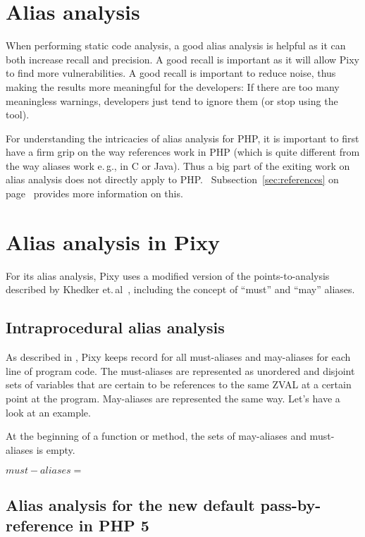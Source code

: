 \chapter{Alias analysis}

When performing static code analysis, a good alias analysis is helpful as it can both increase recall and precision. A good recall is important as it will allow Pixy to find more vulnerabilities. A good recall is important to reduce noise, thus making the results more meaningful for the developers: If there are too many meaningless warnings, developers just tend to ignore them (or stop using the tool).~\cite{understanding-value}

For understanding the intricacies of alias analysis for PHP, it is important to first have a firm grip on the way references work in PHP (which is quite different from the way aliases work e.\,g., in C or Java). Thus a big part of the exiting work on alias analysis does not directly apply to PHP.~\cite[page~24]{pixy} Subsection~\ref{sec:references} on page~\pageref{sec:references} provides more information on this.

\chapter{Alias analysis in Pixy}

For its alias analysis, Pixy uses a modified version of the points-to-analysis described by Khedker et.\,al~\cite[page 119ff]{khedker}, including the concept of ``must'' and ``may'' aliases.

\section{Intraprocedural alias analysis}

As described in \cite{pixy}, Pixy keeps record for all must-aliases and may-aliases for each line of program code. The must-aliases are represented as unordered and disjoint sets of variables that are certain to be references to the same ZVAL at a certain point at the program. May-aliases are represented the same way. Let's have a look at an example.

At the beginning of a function or method, the sets of may-aliases and must-aliases is empty.

$must-aliases = $

\begin{phpcode}

\end{phpcode}


\section{Alias analysis for the new default pass-by-reference in PHP 5}

